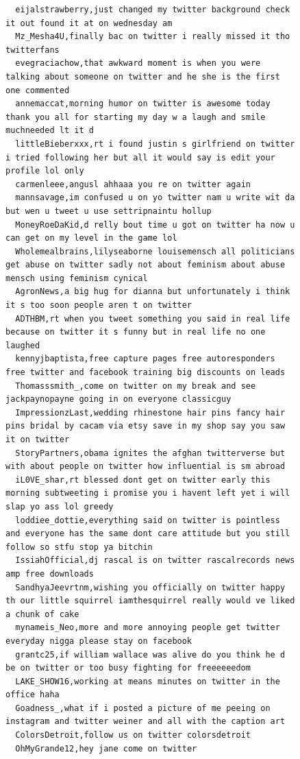 \begin{figure}[htpb]
\begin{verbatim}
  eijalstrawberry,just changed my twitter background check it out found it at on wednesday am
  Mz_Mesha4U,finally bac on twitter i really missed it tho twitterfans
  evegraciachow,that awkward moment is when you were talking about someone on twitter and he she is the first one commented
  annemaccat,morning humor on twitter is awesome today thank you all for starting my day w a laugh and smile muchneeded lt it d
  littleBieberxxx,rt i found justin s girlfriend on twitter i tried following her but all it would say is edit your profile lol only
  carmenleee,angusl ahhaaa you re on twitter again
  mannsavage,im confused u on yo twitter nam u write wit da but wen u tweet u use settripnaintu hollup
  MoneyRoeDaKid,d relly bout time u got on twitter ha now u can get on my level in the game lol
  Wholemealbrains,lilyseaborne louisemensch all politicians get abuse on twitter sadly not about feminism about abuse mensch using feminism cynical
  AgronNews,a big hug for dianna but unfortunately i think it s too soon people aren t on twitter
  ADTHBM,rt when you tweet something you said in real life because on twitter it s funny but in real life no one laughed
  kennyjbaptista,free capture pages free autoresponders free twitter and facebook training big discounts on leads
  Thomasssmith_,come on twitter on my break and see jackpaynopayne going in on everyone classicguy
  ImpressionzLast,wedding rhinestone hair pins fancy hair pins bridal by cacam via etsy save in my shop say you saw it on twitter
  StoryPartners,obama ignites the afghan twitterverse but with about people on twitter how influential is sm abroad
  iL0VE_shar,rt blessed dont get on twitter early this morning subtweeting i promise you i havent left yet i will slap yo ass lol greedy
  loddiee_dottie,everything said on twitter is pointless and everyone has the same dont care attitude but you still follow so stfu stop ya bitchin
  IssiahOfficial,dj rascal is on twitter rascalrecords news amp free downloads
  SandhyaJeevrtnm,wishing you officially on twitter happy th our little squirrel iamthesquirrel really would ve liked a chunk of cake
  mynameis_Neo,more and more annoying people get twitter everyday nigga please stay on facebook
  grantc25,if william wallace was alive do you think he d be on twitter or too busy fighting for freeeeeedom
  LAKE_SHOW16,working at means minutes on twitter in the office haha
  Goadness_,what if i posted a picture of me peeing on instagram and twitter weiner and all with the caption art
  ColorsDetroit,follow us on twitter colorsdetroit
  OhMyGrande12,hey jane come on twitter

\end{verbatim}
\end{figure}
